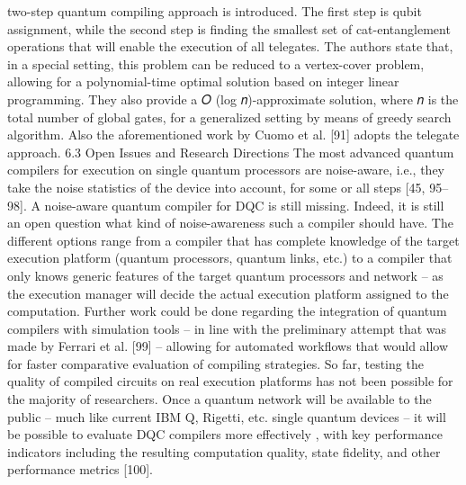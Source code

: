 two-step quantum compiling approach is introduced. The first step is qubit assignment, while the second step is finding the smallest set of cat-entanglement operations that will enable the execution of all telegates. The authors state that, in a special setting, this problem can be reduced to a vertex-cover problem, allowing for a polynomial-time optimal solution based on integer linear programming. They also provide a 𝑂 (log 𝑛)-approximate solution, where 𝑛 is the total number of global gates, for a generalized setting by means of greedy search algorithm. Also the aforementioned work by Cuomo et al. [91] adopts the telegate approach. 6.3 Open Issues and Research Directions The most advanced quantum compilers for execution on single quantum processors are noise-aware, i.e., they take the noise statistics of the device into account, for some or all steps [45, 95–98]. A noise-aware quantum compiler for DQC is still missing. Indeed, it is still an open question what kind of noise-awareness such a compiler should have. The different options range from a compiler that has complete knowledge of the target execution platform (quantum processors, quantum links, etc.) to a compiler that only knows generic features of the target quantum processors and network – as the execution manager will decide the actual execution platform assigned to the computation. Further work could be done regarding the integration of quantum compilers with simulation tools – in line with the preliminary attempt that was made by Ferrari et al. [99] – allowing for automated workflows that would allow for faster comparative evaluation of compiling strategies. So far, testing the quality of compiled circuits on real execution platforms has not been possible for the majority of researchers. Once a quantum network will be available to the public – much like current IBM Q, Rigetti, etc. single quantum devices – it will be possible to evaluate DQC compilers more effectively , with key performance indicators including the resulting computation quality, state fidelity, and other performance metrics [100].

